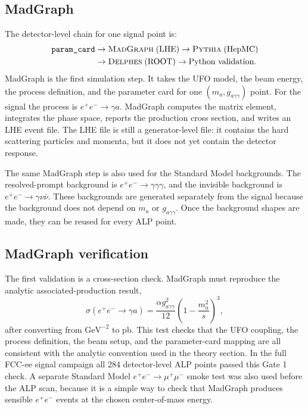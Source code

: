 \documentclass[12pt,a4paper]{article}
\begin{document}
\subsection{MadGraph}

The detector-level chain for one signal point is:
\begin{equation}
    \begin{aligned}
    \texttt{param\_card}
    &\to \textsc{MadGraph}\;(\text{LHE})
    \to \textsc{Pythia}\;(\text{HepMC})\\
    &\to \textsc{Delphes}\;(\text{ROOT})
    \to \text{Python validation}.
    \end{aligned}
    \label{eq:pipeline}
\end{equation}
MadGraph is the first simulation step. It takes the UFO model, the beam energy,
the process definition, and the parameter card for one
$(m_{a},g_{a\gamma\gamma})$ point. For the signal the process is
$e^+e^-\to\gamma a$. MadGraph computes the matrix element, integrates the
phase space, reports the production cross section, and writes an LHE event
file. The LHE file is still a generator-level file: it contains the hard
scattering particles and momenta, but it does not yet contain the detector
response.

The same MadGraph step is also used for the Standard Model backgrounds. The
resolved-prompt background is $e^+e^-\to\gamma\gamma\gamma$, and the invisible
background is $e^+e^-\to\gamma\nu\bar{\nu}$. These backgrounds are generated
separately from the signal because the background does not depend on
$m_{a}$ or $g_{a\gamma\gamma}$. Once the background shapes are made, they can
be reused for every ALP point.

\subsection{MadGraph verification}

The first validation is a cross-section check. MadGraph must reproduce the
analytic associated-production result,
\begin{equation}
    \sigma(e^+e^-\to\gamma a)
    =
    \frac{\alpha g_{a\gamma\gamma}^2}{12}
    \left(1-\frac{m_{a}^{2}}{s}\right)^3,
    \label{eq:mg_verification_xsec}
\end{equation}
after converting from $\text{GeV}^{-2}$ to pb. This test checks that the UFO
coupling, the process definition, the beam setup, and the parameter-card
mapping are all consistent with the analytic convention used in the theory
section. In the full FCC-ee signal campaign all 284 detector-level ALP points
passed this Gate 1 check. A separate Standard Model
$e^+e^-\to\mu^+\mu^-$ smoke test was also used before the ALP scan, because it
is a simple way to check that MadGraph produces sensible $e^+e^-$ events at
the chosen center-of-mass energy.
\end{document}
